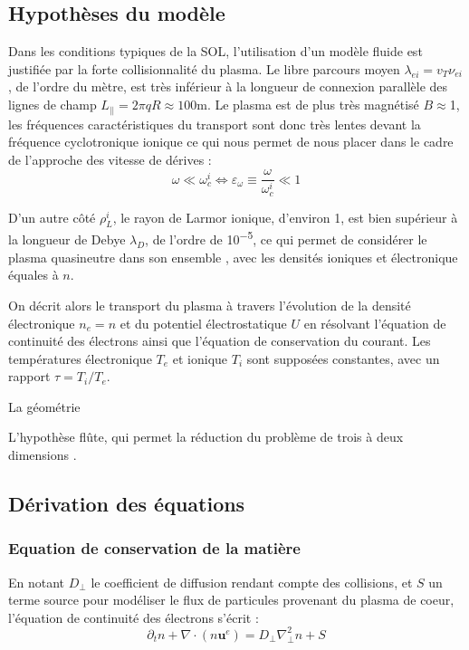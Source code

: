 \subsection{Hypothèses du modèle}
Dans les conditions typiques de la SOL, l'utilisation d'un modèle fluide est
justifiée par la forte collisionnalité du plasma. Le libre parcours moyen
$\lambda_{ei}=v_T \nu_{ei}$, de l'ordre du mètre, est très inférieur à la
longueur de connexion parallèle des lignes de champ $L_{||}=2\pi q R\approx
100\text{m}$.
Le plasma est de plus très magnétisé $B\approx$\unit{1}{\tesla}, les fréquences
caractéristiques du transport sont donc très lentes devant la fréquence
cyclotronique ionique ce qui nous permet de nous placer dans le cadre de
l'approche des vitesse de dérives :
\begin{equation}
\omega\ll\omega_c^i\Leftrightarrow \varepsilon_\omega\equiv\frac{\omega}{\omega_c^i}\ll 1
\end{equation}

D'un autre côté $\rho_L^i$, le rayon de Larmor ionique, d'environ
\unit{1}{\milli\meter}, est bien supérieur à la longueur de
Debye $\lambda_D$, de l'ordre de \unit{10^{-5}}{\meter}, ce qui permet de
considérer le plasma quasineutre dans son ensemble
, avec les densités ioniques et électronique équales à $n$.

On décrit alors le transport du plasma à travers l'évolution de la densité
électronique $n_e=n$ et du potentiel électrostatique $U$ en résolvant l'équation
de continuité des électrons ainsi que l'équation de conservation du courant. Les
températures électronique
$T_e$ et ionique $T_i$ sont supposées constantes, avec un rapport $\tau=T_i/T_e$.

La géométrie 

L'hypothèse flûte, qui permet la réduction du problème de trois à deux
dimensions .
\subsection{Dérivation des équations}
\subsubsection{Equation de conservation de la matière}
En notant $D_\perp$ le coefficient de diffusion rendant compte des collisions,
et $S$ un terme source pour modéliser le flux de particules provenant du plasma
de coeur, l'équation de continuité des électrons s'écrit :
\begin{equation}
\label{2-ContinuiteElectrons}
\partial_t n + \nabla\cdot(n\mathbf{u}^e) = D_\perp\nabla^2_\perp n + S
\end{equation}

